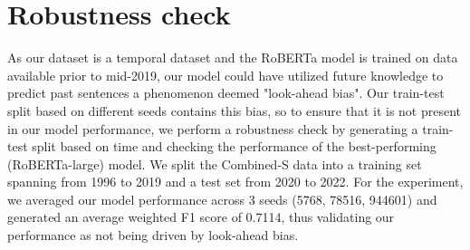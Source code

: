 \documentclass[11pt]{article}
\begin{document}
\section{Robustness check}
\label{ap:robust}
As our dataset is a temporal dataset and the RoBERTa model is trained on data available prior to mid-2019, our model could have utilized future knowledge to predict past sentences a phenomenon deemed "look-ahead bias". Our train-test split based on different seeds contains this bias, so to ensure that it is not present in our model performance, we perform a robustness check by generating a train-test split based on time and checking the performance of the best-performing (RoBERTa-large) model. We split the Combined-S data into a training set spanning from 1996 to 2019 and a test set from 2020 to 2022. For the experiment, we averaged our model performance across 3 seeds (5768, 78516, 944601) and generated an average weighted F1 score of 0.7114, thus validating our performance as not being driven by look-ahead bias. 
\end{document}
